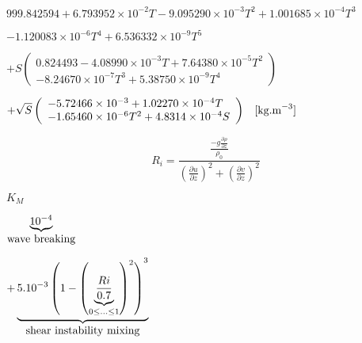 {\newpage\clearpage
{}%
$\displaystyle 999.842594+6.793952\times 10^{-2}T
-9.095290\times 10^{-3}T^2+1.001685\times 10^{-4}T^3$%
\lthtmlindisplaymathZ
\lthtmlcheckvsize\clearpage}

{\newpage\clearpage
{}%
$\displaystyle - 1.120083\times 10^{-6}T^4+6.536332\times 10^{-9}T^5$%
\lthtmlindisplaymathZ
\lthtmlcheckvsize\clearpage}

{\newpage\clearpage
{}%
$\displaystyle + S\left(\begin{array}{l}
0.824493
-4.08990\times 10^{-3}T
+7.64380\times 10^{-5}T^2 \\
-8.24670\times 10^{-7}T^3
+5.38750\times 10^{-9}T^4
\end{array}\right)$%
\lthtmlindisplaymathZ
\lthtmlcheckvsize\clearpage}

{\newpage\clearpage
{}%
$\displaystyle +\sqrt{S}\left(\begin{array}{l}
-5.72466\times 10^{-3}
+1.02270\times 10^{-4}T \\
-1.65460\times 10^{-6}T^2
+4.8314\times 10^{-4}S
\end{array}\right)
\;\;\;[\hbox{kg.m}^{-3}]$%
\lthtmlindisplaymathZ
\lthtmlcheckvsize\clearpage}

{\newpage\clearpage
{}%
\begin{displaymath}
R_i=
\frac{\frac{-g \frac{\partial \rho}{\partial z}}{\rho_0}} 
{\left(\frac{\partial u}{\partial z}\right)^2+
\left(\frac{\partial v}{\partial z}\right)^2}
\end{displaymath}%
\lthtmldisplayZ
\lthtmlcheckvsize\clearpage}

{\newpage\clearpage
{}%
$\displaystyle K_M$%
\lthtmlindisplaymathZ
\lthtmlcheckvsize\clearpage}

{\newpage\clearpage
{}%
$\displaystyle \underbrace{10^{-4}}_{\hbox{wave breaking}}$%
\lthtmlindisplaymathZ
\lthtmlcheckvsize\clearpage}

{\newpage\clearpage
{}%
$\displaystyle +
\underbrace{5.10^{-3}\left(1-
\left(\underbrace{\frac{Ri}{0.7}}
_{0\le ... \le 1}\right)^2
\right)^3}_{\hbox{shear instability mixing}}$%
\lthtmlindisplaymathZ
\lthtmlcheckvsize\clearpage}

